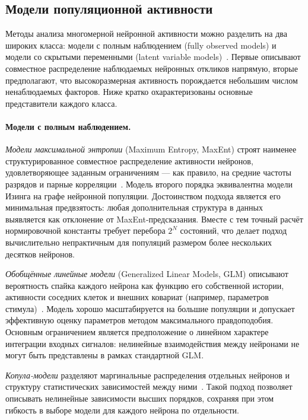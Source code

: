 
\subsection{Модели популяционной активности}\label{sec:lit_popmodels}

Методы анализа многомерной нейронной активности можно разделить на два широких класса: модели с полным наблюдением (fully observed models) и модели со скрытыми переменными (latent variable models)~\cite{Cunningham2014}. Первые описывают совместное распределение наблюдаемых нейронных откликов напрямую, вторые предполагают, что высокоразмерная активность порождается небольшим числом ненаблюдаемых факторов. Ниже кратко охарактеризованы основные представители каждого класса.

\paragraph{Модели с полным наблюдением.}
\textit{Модели максимальной энтропии} (Maximum Entropy, MaxEnt) строят наименее структурированное совместное распределение активности нейронов, удовлетворяющее заданным ограничениям --- как правило, на средние частоты разрядов и парные корреляции~\cite{SavinTkacik2017}. Модель второго порядка эквивалентна модели Изинга на графе нейронной популяции. Достоинством подхода является его минимальная предвзятость: любая дополнительная структура в данных выявляется как отклонение от MaxEnt-предсказания. Вместе с тем точный расчёт нормировочной константы требует перебора $2^N$ состояний, что делает подход вычислительно непрактичным для популяций размером более нескольких десятков нейронов.

\textit{Обобщённые линейные модели} (Generalized Linear Models, GLM) описывают вероятность спайка каждого нейрона как функцию его собственной истории, активности соседних клеток и внешних ковариат (например, параметров стимула)~\cite{Truccolo2005}. Модель хорошо масштабируется на большие популяции и допускает эффективную оценку параметров методом максимального правдоподобия. Основным ограничением является предположение о линейном характере интеграции входных сигналов: нелинейные взаимодействия между нейронами не могут быть представлены в рамках стандартной GLM.

\textit{Копула-модели} разделяют маргинальные распределения отдельных нейронов и структуру статистических зависимостей между ними~\cite{Jenison2004}. Такой подход позволяет описывать нелинейные зависимости высших порядков, сохраняя при этом гибкость в выборе модели для каждого нейрона по отдельности.

